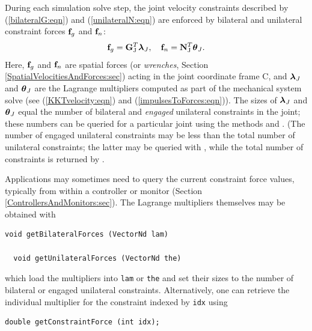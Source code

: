 During each simulation solve step, the joint velocity constraints
described by (\ref{bilateralG:eqn}) and (\ref{unilateralN:eqn}) are
enforced by bilateral and unilateral constraint forces ${\bf f}_g$ and
${\bf f}_n$:
%
\begin{equation}
{\bf f}_g = {\bf G}_\text{J}^T \boldsymbol\lambda_J, \quad {\bf f}_n = {\bf N}_\text{J}^T \boldsymbol\theta_J.
\end{equation}
%
Here, ${\bf f}_g$ and ${\bf f}_n$ are spatial forces (or {\it wrenches}, Section
\ref{SpatialVelocitiesAndForces:sec}) acting in the joint coordinate
frame C, and $\boldsymbol\lambda_J$ and $\boldsymbol\theta_J$ are the Lagrange multipliers
computed as part of the mechanical system solve (see
(\ref{KKTvelocity:eqn}) and (\ref{impulsesToForces:eqn})).  The sizes
of $\boldsymbol\lambda_J$ and $\boldsymbol\theta_J$ equal the number of bilateral and {\it
engaged} unilateral constraints in the joint; these numbers can be
queried for a particular joint using the methods
and
.
(The number of engaged unilateral constraints may be less than the
total number of unilateral constraints; the latter may be queried with
,
while the total number of
constraints is returned by
.

Applications may sometimes need to query the current constraint force
values, typically from within a controller
or monitor (Section \ref{ControllersAndMonitors:sec}).
The Lagrange multipliers themselves may be obtained with
\begin{lstlisting}[]
  void getBilateralForces (VectorNd lam)

  void getUnilateralForces (VectorNd the)
\end{lstlisting}
%
which load the multipliers into {\tt lam} or {\tt the} and set their
sizes to the number of bilateral or engaged unilateral
constraints. Alternatively, one can retrieve the individual multiplier
for the constraint indexed by {\tt idx} using
\begin{lstlisting}[]
  double getConstraintForce (int idx);
\end{lstlisting}
%

